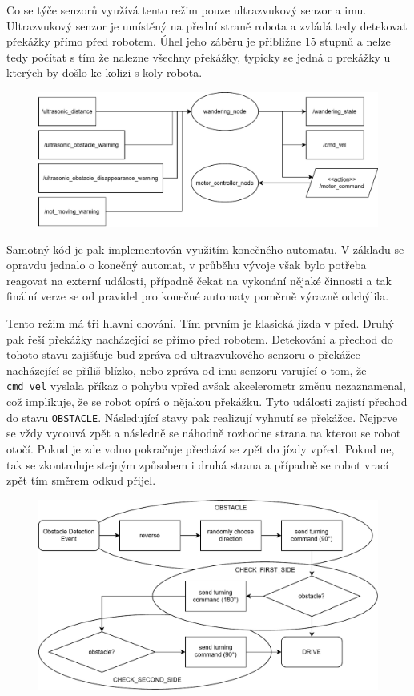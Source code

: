 Co se týče senzorů využívá tento režim pouze ultrazvukový senzor a imu. Ultrazvukový senzor je umístěný na přední straně robota a zvládá tedy detekovat překážky přímo před robotem. Úhel jeho záběru je přibližne 15 stupnů a nelze tedy počítat s tím že nalezne všechny překážky, typicky se jedná o prekážky u kterých by došlo ke kolizi s koly robota. 

\begin{figure}[h!]
	\centering
	\includegraphics[scale=0.75]{obrazky-figures/wandering_rqt.pdf}
	\caption{}
	\label{}
\end{figure}


Samotný kód je pak implementován využitím konečného automatu. V základu se opravdu jednalo o konečný automat, v průběhu vývoje však bylo potřeba reagovat na externí události, případně čekat na vykonání nějaké činnosti a tak finální verze se od pravidel pro konečné automaty poměrně výrazně odchýlila.

Tento režim má tři hlavní chování. Tím prvním je klasická jízda v před. 
Druhý pak řeší překážky nacházející se přímo před robotem. Detekování a přechod do tohoto stavu zajišťuje buď zpráva od ultrazvukového senzoru o překážce nacházející se příliš blízko, nebo zpráva od imu senzoru varující o tom, že \verb|cmd_vel| vyslala příkaz o pohybu vpřed avšak akcelerometr změnu nezaznamenal, což implikuje, že se robot opírá o nějakou překážku. Tyto události zajistí přechod do stavu \verb|OBSTACLE|. Následující stavy pak realizují vyhnutí se překážce. Nejprve se vždy vycouvá zpět a následně se náhodně rozhodne strana na kterou se robot otočí. Pokud je zde volno pokračuje přechází se zpět do jízdy vpřed. Pokud ne, tak se zkontroluje stejným způsobem i druhá strana a případně se robot vrací zpět tím směrem odkud přijel.

\begin{figure}[h!]
	\centering
	\includegraphics[scale=0.75]{obrazky-figures/wandering_obstacle_diagram.pdf}
	\caption{}
	\label{}
\end{figure}

